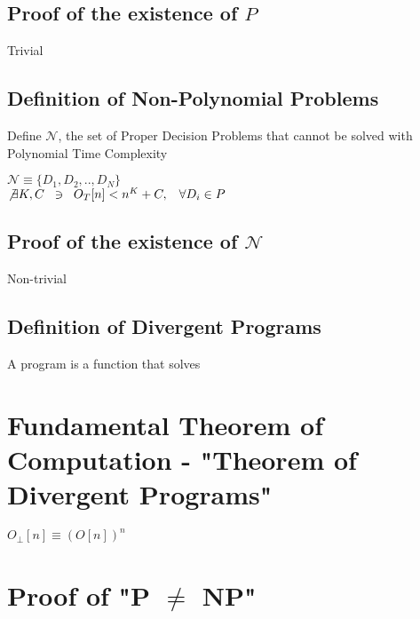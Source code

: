 \documentclass[11pt]{article}
\begin{document}
\subsection{Proof of the existence of $P$}
Trivial

\subsection{Definition of Non-Polynomial Problems}
Define $\mathcal{N}$, the set of Proper Decision Problems that cannot be solved with Polynomial Time Complexity
\begin{center}
$
\mathcal{N} \equiv \{ D_1,D_2,..,D_N \} 
$\\
$ 
\not \exists K,C\hspace{2mm} \ni \hspace{2mm} O_T[n] < n^K + C, \hspace{3mm} \forall D_i \in P
$
\end{center}

\subsection{Proof of the existence of $\mathcal{N}$}
Non-trivial


\subsection{Definition of Divergent Programs}
A program is a function that solves





\section{Fundamental Theorem of Computation - "Theorem of Divergent Programs"}
\begin{center}
$
O_\perp [n] \equiv (O[n])^n
$
\end{center}






\section{Proof of "P $\neq$ NP"}
\end{document}
